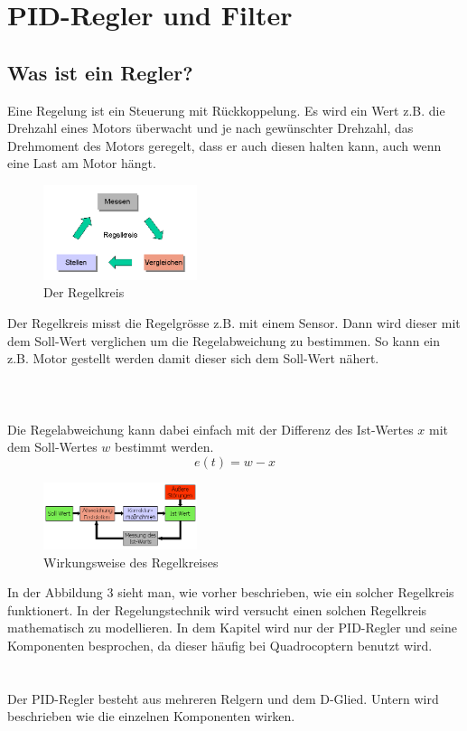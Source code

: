 \documentclass[12pt,a4paper, ngerman]{article}
\begin{document}
\section{PID-Regler und Filter}
\subsection{Was ist ein Regler?}
Eine Regelung ist ein Steuerung mit Rückkoppelung. Es wird ein Wert z.B. die Drehzahl eines Motors überwacht und je nach gewünschter Drehzahl, das Drehmoment des Motors geregelt, dass er auch diesen halten kann, auch wenn eine Last am Motor hängt.\cite{website:rn-wissen_Regelungstechnik}\\
\begin{figure}
\centering
\includegraphics[width=0.4\textwidth]{Regelkreis1.png}
\caption[https://rn-wissen.de/wiki/images/2/25/Regelkreis1.png]{Der Regelkreis}
\end{figure}
Der Regelkreis misst die Regelgrösse z.B. mit einem Sensor. Dann wird dieser mit dem Soll-Wert verglichen um die Regelabweichung zu bestimmen. So kann ein z.B. Motor gestellt werden damit dieser sich dem Soll-Wert nähert.\\ \\ \\ \\

Die Regelabweichung kann dabei einfach mit der Differenz des Ist-Wertes $x$ mit dem Soll-Wertes $w$ bestimmt werden.
\begin{equation}
e(t)=w-x
\end{equation}
\begin{figure}
\centering
\includegraphics[width=0.4\textwidth]{Regelkreis2.png}
\caption[https://rn-wissen.de/wiki/images/5/5d/Regelkreis2.png]{Wirkungsweise des Regelkreises}
\end{figure}
In der Abbildung 3 sieht man, wie vorher beschrieben, wie ein solcher Regelkreis funktionert. In der Regelungstechnik wird versucht einen solchen Regelkreis mathematisch zu modellieren. In dem Kapitel wird nur der PID-Regler und seine Komponenten besprochen, da dieser häufig bei Quadrocoptern benutzt wird.
\\ \\ \\
Der PID-Regler besteht aus mehreren Relgern und dem D-Glied. Untern wird beschrieben wie die einzelnen Komponenten wirken. 
\end{document}
